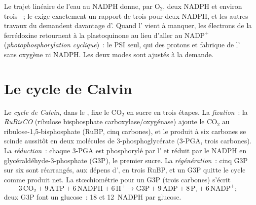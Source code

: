 \begin{example}\label{ex:b1:photosynthesis:cyclic}
Le trajet linéaire de l'eau au NADPH donne, par $\mathrm{O_2}$, deux
NADPH et environ trois ~; le  exige exactement un
rapport de trois  pour deux NADPH, et les autres travaux du
 demandent davantage d'. Quand l' vient à manquer, les
électrons de la ferrédoxine retournent à la plastoquinone au lieu
d'aller au $\mathrm{NADP^+}$ (\emph{photophosphorylation cyclique})~: le
PSI seul, qui  des protons et fabrique de l' sans oxygène ni
NADPH. Les deux modes sont ajustés à la demande.
\end{example}

\section{Le cycle de Calvin}

\begin{definition}\label{def:b1:photosynthesis:fixation}
Le \emph{cycle de Calvin}, dans le , fixe le $\mathrm{CO_2}$ en
sucre en trois étapes. La \emph{fixation}~: la \emph{RuBisCO} (ribulose
bisphosphate carboxylase/oxygénase) ajoute le $\mathrm{CO_2}$ au
ribulose-1,5-bisphosphate (RuBP, cinq carbones), et le produit à six
carbones se scinde aussitôt en deux molécules de 3-phosphoglycérate
(3-PGA, trois carbones). La \emph{réduction}~: chaque 3-PGA est
phosphorylé par l' et réduit par le NADPH en
glycéraldéhyde-3-phosphate (G3P), le premier sucre. La
\emph{régénération}~: cinq G3P sur six sont réarrangés, aux dépens
d', en trois RuBP, et un G3P quitte le cycle comme produit net. La
stœchiométrie pour un G3P (trois carbones) s'écrit
\[
3\,\mathrm{CO_2} + 9\,\mathrm{ATP} + 6\,\mathrm{NADPH} + 6\,\mathrm{H^+}
\to \text{G3P} + 9\,\mathrm{ADP} + 8\,\mathrm{P_i} + 6\,\mathrm{NADP^+} ;
\]
deux G3P font un glucose~: \qty{18}{}  et \qty{12}{NADPH} par glucose.
\end{definition}


